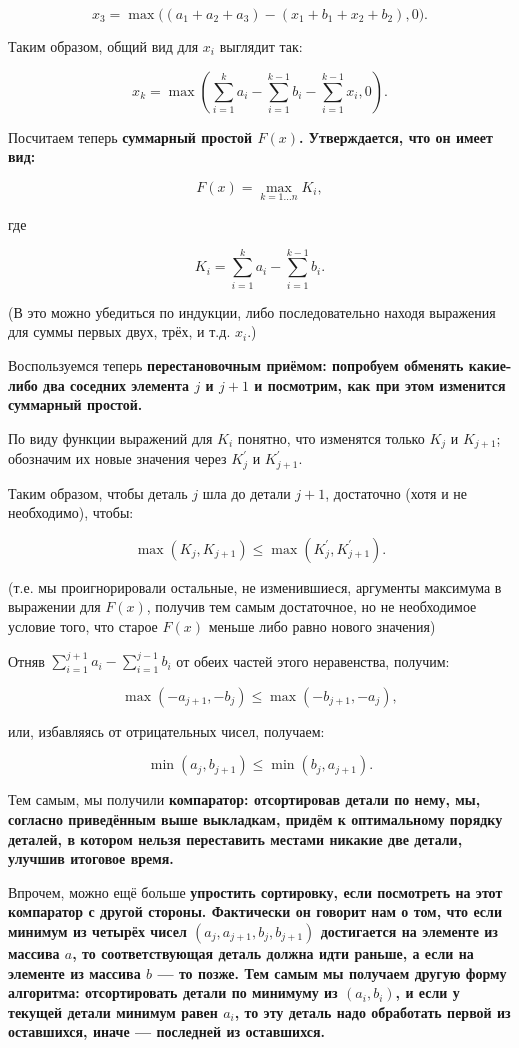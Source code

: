 $$ x_3 = \max \Big( (a_1+a_2+a_3) - (x_1+b_1+x_2+b_2), 0 \Big). $$

Таким образом, общий вид для $x_i$ выглядит так:

$$ x_k = \max \left( \sum_{i=1}^{k} a_i - \sum_{i=1}^{k-1} b_i - \sum_{i=1}^{k-1} x_i, 0 \right). $$

Посчитаем теперь \bf{суммарный простой} $F(x)$. Утверждается, что он имеет вид:

$$ F(x) = \max_{k=1 \ldots n} K_i, $$

где

$$ K_i = \sum_{i=1}^{k} a_i - \sum_{i=1}^{k-1} b_i. $$

(В это можно убедиться по индукции, либо последовательно находя выражения для суммы первых двух, трёх, и т.д. $x_i$.)

Воспользуемся теперь \bf{перестановочным приёмом}: попробуем обменять какие-либо два соседних элемента $j$ и $j+1$ и посмотрим, как при этом изменится суммарный простой.

По виду функции выражений для $K_i$ понятно, что изменятся только $K_j$ и $K_{j+1}$; обозначим их новые значения через $K_j^\prime$ и $K_{j+1}^\prime$.

Таким образом, чтобы деталь $j$ шла до детали $j+1$, достаточно (хотя и не необходимо), чтобы:

$$ \max \left( K_j, K_{j+1} \right) \le \max \left( K_j^\prime, K_{j+1}^\prime \right). $$

(т.е. мы проигнорировали остальные, не изменившиеся, аргументы максимума в выражении для $F(x)$, получив тем самым достаточное, но не необходимое условие того, что старое $F(x)$ меньше либо равно нового значения)

Отняв $ \sum_{i=1}^{j+1} a_i - \sum_{i=1}^{j-1} b_i $ от обеих частей этого неравенства, получим:

$$ \max (-a_{j+1}, -b_j) \le \max (-b_{j+1}, -a_j), $$

или, избавляясь от отрицательных чисел, получаем:

$$ \min (a_j, b_{j+1}) \le \min (b_j, a_{j+1}). $$

Тем самым, мы получили \bf{компаратор}: отсортировав детали по нему, мы, согласно приведённым выше выкладкам, придём к оптимальному порядку деталей, в котором нельзя переставить местами никакие две детали, улучшив итоговое время.

Впрочем, можно ещё больше \bf{упростить} сортировку, если посмотреть на этот компаратор с другой стороны. Фактически он говорит нам о том, что если минимум из четырёх чисел $(a_j, a_{j+1}, b_{j}, b_{j+1})$ достигается на элементе из массива $a$, то соответствующая деталь должна идти раньше, а если на элементе из массива $b$ --- то позже. Тем самым мы получаем другую форму алгоритма: отсортировать детали по минимуму из $(a_i, b_i)$, и если у текущей детали минимум равен $a_i$, то эту деталь надо обработать первой из оставшихся, иначе --- последней из оставшихся.

